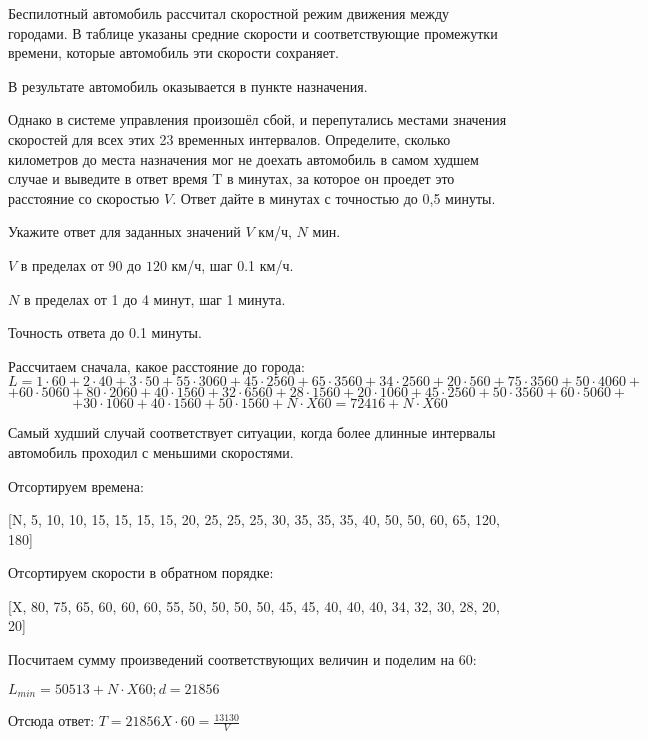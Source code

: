 Беспилотный
автомобиль рассчитал скоростной режим движения между городами. В таблице указаны средние скорости и соответствующие промежутки времени, которые автомобиль эти скорости сохраняет.


В результате автомобиль оказывается в пункте назначения.

Однако в системе
управления произошёл сбой, и перепутались местами значения
скоростей для всех этих 23 временных интервалов. 
Определите, сколько километров до места назначения мог не доехать
автомобиль в самом худшем случае и выведите в ответ время T в минутах, за которое он проедет это расстояние со скоростью $V$. Ответ дайте в минутах с точностью до 0,5 минуты.

Укажите ответ для заданных значений $V$ км/ч, $N$ мин.

\paramSection

$V$ в пределах от $90$ до $120$ км/ч, шаг  0.1 км/ч.  

$N$ в пределах от 1 до 4 минут, шаг  1 минута.

Точность ответа  до  0.1 минуты.

\solutionSection

Рассчитаем сначала, какое расстояние до города:
$$L=1 \cdot 60 +2 \cdot 40+ 3 \cdot 50+ 55 \cdot 3060+45 \cdot 2560+ 65 \cdot 3560+ 34 \cdot 2560+ 20 \cdot 560+ 75 \cdot 3560+ 50 \cdot 4060+$$
$$+ 60 \cdot 5060+80 \cdot 2060+40 \cdot 1560+ 32 \cdot 6560+ 28 \cdot 1560+20 \cdot 1060+ 45 \cdot 2560+ 50 \cdot 3560+ 60 \cdot 5060+$$
$$+30 \cdot 1060+40 \cdot 1560+50 \cdot 1560+N \cdot X60=72416+N \cdot X60$$  

Самый худший случай соответствует ситуации, когда более длинные интервалы автомобиль проходил с меньшими скоростями.

Отсортируем времена:

[N, 5, 10, 10, 15, 15, 15, 15, 20, 25, 25, 25, 30, 35, 35, 35, 40, 50, 50, 60, 65, 120, 180]

Отсортируем скорости в обратном порядке:

[X, 80, 75, 65, 60, 60, 60, 55, 50, 50, 50, 50, 45, 45, 40, 40, 40, 34, 32, 30, 28, 20, 20] 

Посчитаем сумму произведений соответствующих величин и поделим на 60:

$L_{min}=50513+N \cdot X60  ;  d=21856$

Отсюда ответ: $ T=21856 X \cdot 60= \frac{13130}{V}$

